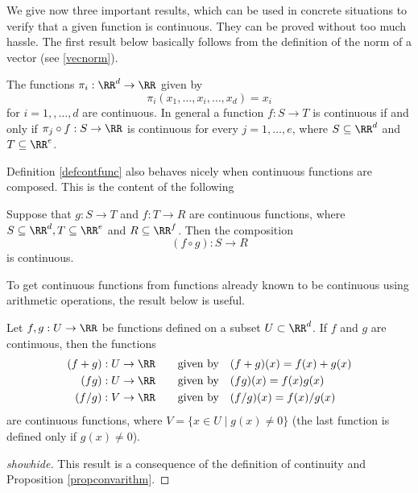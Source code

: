 \documentclass{article}
\begin{document}
We give now three important results, which can be used
in concrete situations to verify that a given function is continuous. They can
be proved without too much hassle. The first result below basically follows from the
definition of the norm of a vector (see \eqref{vecnorm}).

\begin{lemma}[emph]\label{Lemma:proj}
  The functions $\pi_i:\RR^d\rightarrow \RR$ given by
  $$
  \pi_i(x_1, \dots, x_i, \dots, x_d) = x_i
  $$
  for $i = 1, ,\dots, d$ are continuous. In general a function
  $f:S\rightarrow T$ is continuous if and only if $\pi_j\circ f: S\rightarrow \RR$
  is continuous for every $j = 1, \dots, e$, where $S\subseteq \RR^d$ and
  $T\subseteq \RR^e$.
\end{lemma}


Definition \ref{defcontfunc} also behaves nicely when continuous functions
are composed. This is the content of the following

\begin{proposition}[emph]
  Suppose that $g: S\rightarrow T$ and $f: T\rightarrow R$ are continuous
  functions, where $S\subseteq \RR^d, T\subseteq \RR^e$ and $R\subseteq \RR^f$. Then
  the composition
  $$
  (f\circ g): S\rightarrow R
  $$
  is continuous.
\end{proposition}


To get continuous functions from functions already known to be continuous using
arithmetic operations, the result below is useful.

\begin{proposition}[emph]\label{contfunccomp}
Let $f, g: U\rightarrow \RR$ be functions defined on a subset $U\subset \RR^d$. If
$f$ and $g$ are continuous, then the functions
\begin{align*}
(f + g): U\rightarrow \RR\qquad\text{given by}\quad &(f + g)(x) = f(x) + g(x)\\
(f g): U\rightarrow \RR\qquad\text{given by}\quad &(f g)(x) = f(x) g(x)\\
(f/g): V\rightarrow \RR\qquad\text{given by}\quad &(f/g)(x) = f(x)/g(x)
\end{align*}
are continuous functions, where $V = \{x\in U\mid g(x)\neq 0\}$ (the last function is
defined only if $g(x)\neq 0$).
\end{proposition}

\begin{proof}[showhide]
This result is a consequence of the definition of continuity and Proposition \ref{propconvarithm}.
\end{proof}
\end{document}
